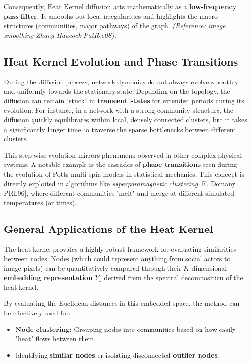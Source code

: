 Consequently, Heat Kernel diffusion acts mathematically as a \textbf{low-frequency pass filter}. It smooths out local irregularities and highlights the macro-structures (communities, major pathways) of the graph.
\textit{(Reference: image smoothing Zhang Hancock PatRec08).}

\subsection{Heat Kernel Evolution and Phase Transitions}

During the diffusion process, network dynamics do not always evolve smoothly and uniformly towards the stationary state. Depending on the topology, the diffusion can remain "stuck" in \textbf{transient states} for extended periods during its evolution. For instance, in a network with a strong community structure, the diffusion quickly equilibrates within local, densely connected clusters, but it takes a significantly longer time to traverse the sparse bottlenecks between different clusters.

This step-wise evolution mirrors phenomena observed in other complex physical systems. A notable example is the cascades of \textbf{phase transitions} seen during the evolution of Potts multi-spin models in statistical mechanics. This concept is directly exploited in algorithms like \textit{superparamagnetic clustering} [E. Domany PRL96], where different communities "melt" and merge at different simulated temperatures (or times).

\subsection{General Applications of the Heat Kernel}
The heat kernel provides a highly robust framework for evaluating similarities between nodes. Nodes (which could represent anything from social actors to image pixels) can be quantitatively compared through their \( K \)-dimensional \textbf{embedding representation} \( Y_k \) derived from the spectral decomposition of the heat kernel.

By evaluating the Euclidean distances in this embedded space, the method can be effectively used for:
\begin{itemize}
    \item \textbf{Node clustering:} Grouping nodes into communities based on how easily "heat" flows between them.
    \item Identifying \textbf{similar nodes} or isolating disconnected \textbf{outlier nodes}.
\end{itemize}

